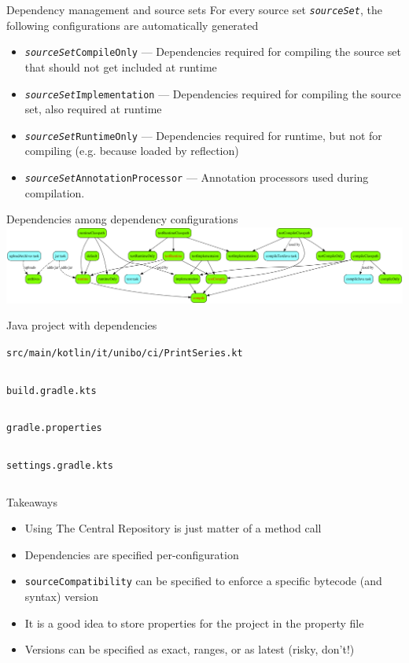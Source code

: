 \documentclass[presentation]{beamer}
\newcommand{\codefile}[4]{
	\begin{block}{\texttt{#2}}
		\inputminted[fontsize=#3,linenos=true,breaklines=true]{#4}{"workspace/#1/#2"}
	\end{block}
}
\newcommand{\kotlin}[3]{\codefile{#1}{#2}{#3}{kotlin}}
\begin{document}
\begin{frame}[fragile]{Dependency management and source sets}
    For every source set \texttt{\textit{sourceSet}}, the following configurations are automatically generated
    \begin{itemize}
        \item \texttt{\textit{sourceSet}CompileOnly} --- Dependencies required for compiling the source set that should not get included at runtime
        \item \texttt{\textit{sourceSet}Implementation} --- Dependencies required for compiling the source set, also required at runtime
        \item \texttt{\textit{sourceSet}RuntimeOnly} --- Dependencies required for runtime, but not for compiling (e.g. because loaded by reflection)
        \item \texttt{\textit{sourceSet}AnnotationProcessor} --- Annotation processors used during compilation.
    \end{itemize}
\end{frame}

\begin{frame}[fragile]{Dependencies among dependency configurations}
    \includegraphics[width=\textwidth]{img/javaPluginConfigurations}
\end{frame}

\begin{frame}{Java project with dependencies}
    \kotlin{01-dependencies}{src/main/kotlin/it/unibo/ci/PrintSeries.kt}{\tiny}
    \kotlin{01-dependencies}{build.gradle.kts}{\normalsize}
    \kotlin{01-dependencies}{gradle.properties}{\scriptsize}
    \kotlin{01-dependencies}{settings.gradle.kts}{\normalsize}
    \begin{block}{Takeaways}
        \begin{itemize}
            \item Using The Central Repository is just matter of a method call
            \item Dependencies are specified per-configuration
            \item \texttt{sourceCompatibility} can be specified to enforce a specific bytecode (and syntax) version
            \item It is a good idea to store properties for the project in the property file
            \item Versions can be specified as exact, ranges, or as latest (risky, don't!)
        \end{itemize}
    \end{block}
\end{frame}
\end{document}
